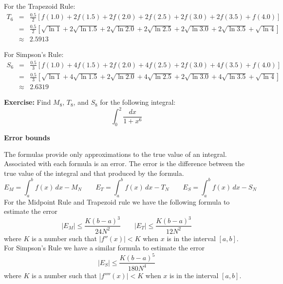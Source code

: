 \documentclass[11pt]{article}
\begin{document}
For the Trapezoid Rule:
\begin{eqnarray*}
T_6 &=& \frac{0.5}{2}\left[f(1.0) + 2f(1.5) + 2f(2.0) + 2f(2.5) + 2f(3.0) + 2f(3.5)+ f(4.0)\right] \\
    &=& \frac{0.5}{2}\left[\sqrt{\ln{1}} + 2\sqrt{\ln{1.5}} + 2\sqrt{\ln{2.0}} + 2\sqrt{\ln{2.5}} + 2\sqrt{\ln{3.0}} + 2\sqrt{\ln{3.5}} + \sqrt{\ln{4}}\right] \\
    &\approx & 2.5913
\end{eqnarray*}

For Simpson's Rule:
\begin{eqnarray*}
S_6 &=& \frac{0.5}{3}\left[f(1.0) + 4f(1.5) + 2f(2.0) + 4f(2.5) + 2f(3.0) + 4f(3.5)+ f(4.0)\right] \\
    &=& \frac{0.5}{3}\left[\sqrt{\ln{1}} + 4\sqrt{\ln{1.5}} + 2\sqrt{\ln{2.0}} + 4\sqrt{\ln{2.5}} + 2\sqrt{\ln{3.0}} + 4\sqrt{\ln{3.5}} + \sqrt{\ln{4}}\right] \\
    &\approx & 2.6319
\end{eqnarray*}

{\bf Exercise:}
Find $M_8$, $T_8$, and $S_8$ for the following integral:
\begin{displaymath}
\int_0^2 \frac{dx}{1+x^6}
\end{displaymath}
\pagebreak

{\bf Error bounds}

The formulas provide only approximations to the true value of an integral.  Associated with each formula is an error.  The error is the difference
between the true value of the integral and that produced by the formula.
\begin{displaymath}
E_M = \int_a^bf(x)\,dx - M_N \quad\quad E_T = \int_a^bf(x)\,dx - T_N \quad\quad E_S = \int_a^bf(x)\,dx - S_N
\end{displaymath}
For the Midpoint Rule and Trapezoid rule we have the following formula to estimate the error
\begin{displaymath}
|E_M| \leq \frac{K(b-a)^3}{24N^2} \quad\quad |E_T| \leq \frac{K(b-a)^3}{12N^2}
\end{displaymath}
where $K$ is a number such that $|f''(x)| < K$ when $x$ is in the interval $[a,b]$.
\\
For Simpson's Rule we have a similar formula to estimate the error
\begin{displaymath}
|E_S| \leq \frac{K(b-a)^5}{180N^4} 
\end{displaymath}
where $K$ is a number such that $|f''''(x)| < K$ when $x$ is in the interval $[a,b]$.
\vspace{0.2cm}
\end{document}
